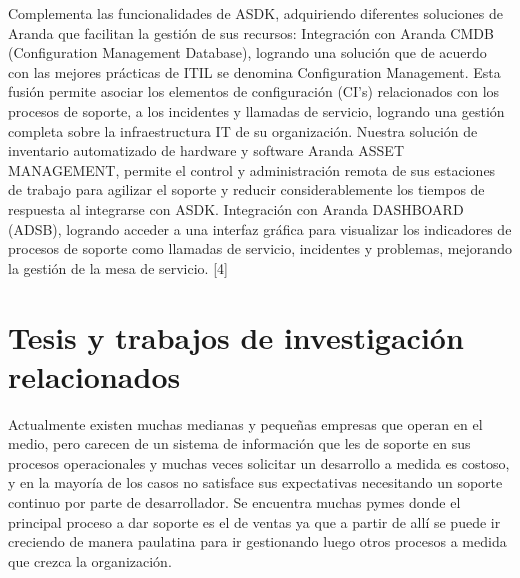 Complementa las funcionalidades de ASDK, adquiriendo diferentes soluciones de Aranda que facilitan la gestión de sus recursos: Integración con Aranda CMDB (Configuration Management Database), logrando una solución que de acuerdo con las mejores prácticas de ITIL se denomina Configuration Management. Esta fusión permite asociar los elementos de configuración (CI’s) relacionados con los procesos de soporte, a los incidentes y llamadas de servicio, logrando una gestión completa sobre la infraestructura IT de su organización. Nuestra solución de inventario automatizado de hardware y software Aranda ASSET MANAGEMENT, permite el control y administración remota de sus estaciones de trabajo para agilizar el soporte y reducir considerablemente los tiempos de respuesta al integrarse con ASDK. Integración con Aranda DASHBOARD (ADSB), logrando acceder a una interfaz gráfica para visualizar los indicadores de procesos de soporte como llamadas de servicio, incidentes y problemas, mejorando la gestión de la mesa de servicio. [4]

\section{Tesis y trabajos de investigación relacionados} 

Actualmente existen muchas medianas y pequeñas empresas que operan en el medio, pero carecen de un sistema de información que les de soporte en sus procesos operacionales y muchas veces solicitar un desarrollo a medida es costoso, y en la mayoría de los casos no satisface sus expectativas necesitando un soporte continuo por parte de desarrollador. Se encuentra muchas pymes donde el principal proceso a dar soporte es el de ventas ya que a partir de allí se puede ir creciendo de manera paulatina para ir gestionando luego otros procesos a medida que crezca la organización. 

